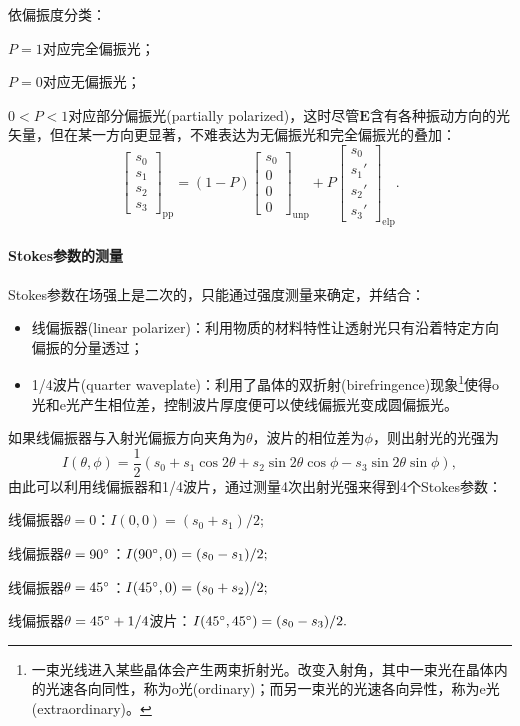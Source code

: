 \begin{corollary}
    依偏振度分类：
    \begin{compactitem}
    	\item $P=1$对应完全偏振光；
    	\item $P=0$对应无偏振光；
    	\item $0<P<1$对应部分偏振光(partially polarized)，这时尽管$\bm E$含有各种振动方向的光矢量，但在某一方向更显著，不难表达为无偏振光和完全偏振光的叠加：
        \[
            \begin{bmatrix}
                s_0\\s_1\\s_2\\s_3
            \end{bmatrix}_\text{pp}=(1-P)
            \begin{bmatrix}
                s_0\\0\\0\\0
            \end{bmatrix}_\text{unp}+P
            \begin{bmatrix}
                s_0\\s_1'\\s_2'\\s_3'
            \end{bmatrix}_\text{elp}.
        \]
    \end{compactitem}
\end{corollary}

\paragraph{Stokes参数的测量}

Stokes参数在场强上是二次的，只能通过强度测量来确定，并结合：
\begin{itemize}
    \item 线偏振器(linear polarizer)：利用物质的材料特性让透射光只有沿着特定方向偏振的分量透过；
    \item 1/4波片(quarter waveplate)：利用了晶体的双折射(birefringence)现象\footnote{一束光线进入某些晶体会产生两束折射光。改变入射角，其中一束光在晶体内的光速各向同性，称为o光(ordinary)；而另一束光的光速各向异性，称为e光(extraordinary)。}使得o光和e光产生相位差，控制波片厚度便可以使线偏振光变成圆偏振光。
\end{itemize}
如果线偏振器与入射光偏振方向夹角为$\theta$，波片的相位差为$\phi$，则出射光的光强为
\[
    I(\theta,\phi)=\frac12(s_0+s_1\cos2\theta+s_2\sin2\theta\cos\phi-s_3\sin2\theta\sin\phi),
\]
由此可以利用线偏振器和1/4波片，通过测量4次出射光强来得到4个Stokes参数：
\begin{compactitem}
	\item 线偏振器$\theta=0$：$I(0,0)=(s_0+s_1)/2;$
    \item 线偏振器$\theta=90^\circ$：$I(90^\circ,0)=(s_0-s_1)/2;$
    \item 线偏振器$\theta=45^\circ$：$I(45^\circ,0)=(s_0+s_2)/2;$
    \item 线偏振器$\theta=45^\circ+1/4$波片：$I(45^\circ,45^\circ)=(s_0-s_3)/2.$
\end{compactitem}


